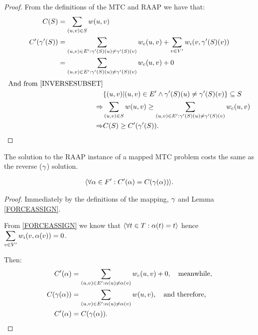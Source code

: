 \begin{proof}
From the definitions of the MTC and RAAP we have that:
\begin{align}
	\nonumber C(S) & = \displaystyle\sum\limits_{(u,v) \in S} w(u,v)\\
	\nonumber C'(\gamma'(S)) & = \displaystyle\sum\limits_{(u,v) \in E' : \gamma'(S)(u) \neq \gamma'(S)(v)} w_c(u,v) + \displaystyle\sum\limits_{v \in V'} w_i(v, \gamma'(S)(v)) \\
	\nonumber & = \displaystyle\sum\limits_{(u,v) \in E' : \gamma'(S)(u) \neq \gamma'(S)(v)} w_c(u,v) + 0
\end{align}
\begin{align}
	\nonumber \mbox{And from \ref{INVERSESUBSET}} & \\
	\nonumber & \{(u,v) | (u,v) \in E' \wedge \gamma'(S)(u) \neq \gamma'(S)(v)\} \subseteq S \\
	\nonumber \Rightarrow & \displaystyle\sum\limits_{(u,v) \in S} w(u,v) \geq \displaystyle\sum\limits_{(u,v) \in E' : \gamma'(S)(u) \neq \gamma'(S)(v)} w_c(u,v) \\
	\nonumber \Rightarrow & C(S) \geq C'(\gamma'(S)).
\end{align}
\end{proof}

\begin{lemma}
\label{REVERSECOST}
The solution to the RAAP instance of a mapped MTC problem costs the same as the reverse ($\gamma$) solution.

\begin{align}
	\nonumber \langle \forall \alpha \in F' : C'(\alpha) = C(\gamma(\alpha)) \rangle.
\end{align}
\end{lemma}

\begin{proof}
Immediately by the definitions of the mapping, $\gamma$ and Lemma \ref{FORCEASSIGN}.

From \ref{FORCEASSIGN} we know that $\langle \forall t \in T : \alpha(t) = t \rangle$ hence $\displaystyle\sum\limits_{v \in V'} w_i(v, \alpha(v)) = 0$.

Then:
\begin{align}
	\nonumber C'(\alpha) & = \displaystyle\sum\limits_{(u,v) \in E' : \alpha(u) \neq \alpha(v)} w_c(u,v) + 0,\quad  \mbox{meanwhile,} \\
	\nonumber C(\gamma(\alpha)) & = \displaystyle\sum\limits_{(u,v) \in E' : \alpha(u) \neq \alpha(v)} w(u,v), \quad \mbox{and therefore,} \\
	\nonumber C'(\alpha) & = C(\gamma(\alpha)).
\end{align}
\end{proof}

